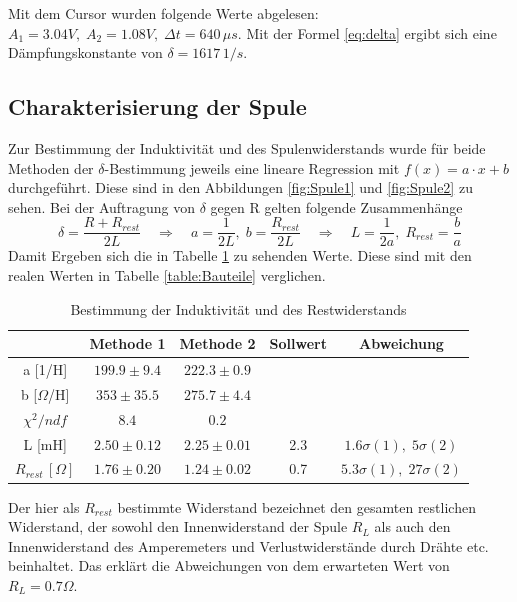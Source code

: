 \documentclass[a4paper, 11pt]{article}
\begin{document}
Mit dem Cursor wurden folgende Werte abgelesen: $A_1 = 3.04V, \;A_2 = 1.08V, \;\Delta t = 640\,\mu s$. Mit der Formel \ref{eq:delta} ergibt sich eine Dämpfungskonstante von $\delta = 1617 \, 1/s$.



\subsection{Charakterisierung der Spule}\label{sec:Spule}
Zur Bestimmung der Induktivität und des Spulenwiderstands wurde für beide Methoden der $\delta$-Bestimmung jeweils eine lineare Regression mit $f(x)=a \cdot x+b$ durchgeführt. Diese sind in den Abbildungen \ref{fig:Spule1} und \ref{fig:Spule2} zu sehen.
Bei der Auftragung von $\delta$ gegen R gelten folgende Zusammenhänge
\begin{equation}
\delta = \frac{R+R_{rest}}{2L} \quad \Rightarrow \quad a = \frac{1}{2L}, \; b = \frac{R_{rest}}{2L} \quad \Rightarrow \quad L = \frac{1}{2a}, \; R_{rest} = \frac{b}{a}
\end{equation}
Damit Ergeben sich die in Tabelle \ref{table:SpuleRL} zu sehenden Werte. Diese sind mit den realen Werten in Tabelle \ref{table:Bauteile} verglichen.

\begin{table}[H]
	\centering
	\renewcommand{\arraystretch}{1.2}
	\begin{tabular}{|c|c|c|c|c|}
		\hline 
		& Methode 1 & Methode 2 & Sollwert & Abweichung\\
		\hline 
		a [1/H] & $199.9 \pm 9.4$ & $222.3 \pm 0.9$ &  &\\
		\hline
		b [$\Omega$/H] & $353 \pm 35.5$ & $ 275.7 \pm 4.4$  & &\\
		\hline
		$\chi^2/ndf$ & $8.4$ & $0.2$ &  &\\
		\hline
		L [mH] & $2.50 \pm 0.12$ & $2.25 \pm 0.01$ & 2.3 & $1.6 \sigma (1), \; 5\sigma (2)$ \\
		\hline
		$R_{rest} \,[\Omega]$ & $1.76 \pm 0.20$ & $1.24 \pm 0.02$ & 0.7 & $5.3\sigma(1), \; 27\sigma(2) $ \\
		\hline
	\end{tabular}
	\label{table:SpuleRL}
	\caption{Bestimmung der Induktivität und des Restwiderstands}
\end{table}

Der hier als $R_{rest}$ bestimmte Widerstand bezeichnet den gesamten restlichen Widerstand, der sowohl den Innenwiderstand der Spule $R_L$ als auch den Innenwiderstand des Amperemeters  und Verlustwiderstände durch Drähte etc. beinhaltet. Das erklärt die Abweichungen von dem erwarteten Wert von $R_L = 0.7 \Omega$.
\end{document}
